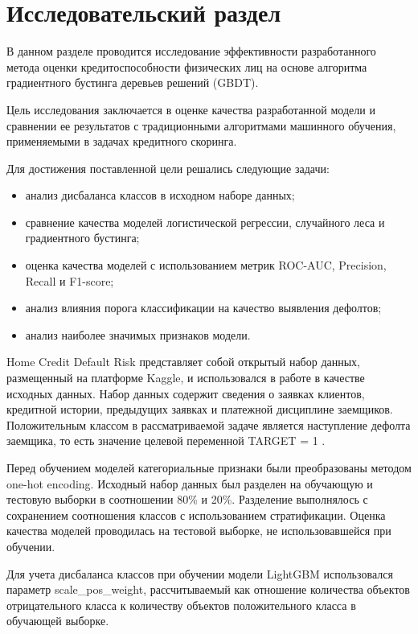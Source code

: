 \section{Исследовательский раздел}

В данном разделе проводится исследование эффективности разработанного метода оценки кредитоспособности физических лиц на основе алгоритма градиентного бустинга деревьев решений (GBDT).

Цель исследования заключается в оценке качества разработанной модели и сравнении ее результатов с традиционными алгоритмами машинного обучения, применяемыми в задачах кредитного скоринга.

Для достижения поставленной цели решались следующие задачи:
\begin{itemize}
    \item анализ дисбаланса классов в исходном наборе данных;
    \item сравнение качества моделей логистической регрессии, случайного леса и градиентного бустинга;
    \item оценка качества моделей с использованием метрик ROC-AUC, Precision, Recall и F1-score;
    \item анализ влияния порога классификации на качество выявления дефолтов;
    \item анализ наиболее значимых признаков модели.
\end{itemize}

Home Credit Default Risk представляет собой открытый набор данных, размещенный на платформе Kaggle, и использовался в работе в качестве исходных данных. Набор данных содержит сведения о заявках клиентов, кредитной истории, предыдущих заявках и платежной дисциплине заемщиков. Положительным классом в рассматриваемой задаче является наступление дефолта заемщика, то есть значение целевой переменной TARGET = 1 \cite{KaggleHomeCreditDefaultRisk}.

Перед обучением моделей категориальные признаки были преобразованы методом one-hot encoding. Исходный набор данных был разделен на обучающую и тестовую выборки в соотношении 80\% и 20\%. Разделение выполнялось с сохранением соотношения классов с использованием стратификации. Оценка качества моделей проводилась на тестовой выборке, не использовавшейся при обучении.

Для учета дисбаланса классов при обучении модели LightGBM использовался параметр scale\_pos\_weight, рассчитываемый как отношение количества объектов отрицательного класса к количеству объектов положительного класса в обучающей выборке.

